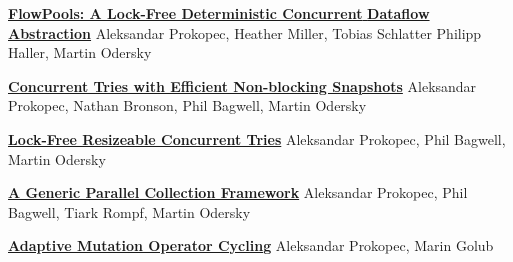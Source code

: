 \documentclass[9pt]{article}
\begin{document}
\noindent\href{http://axel22.github.io/resources/docs/lcpc2012.pdf}
{\bf FlowPools: A Lock-Free Deterministic Concurrent }
\newline
\noindent\href{http://axel22.github.io/resources/docs/lcpc2012.pdf}
{\bf Dataflow Abstraction}
\newline
\noindent Aleksandar Prokopec, Heather Miller, Tobias Schlatter
\newline
\noindent Philipp Haller, Martin Odersky
\newline
{}
\bigskip

\noindent\href{http://axel22.github.io/resources/docs/ctries-snapshot.pdf}
{\bf Concurrent Tries with Efficient Non-blocking Snapshots}
\newline
\noindent Aleksandar Prokopec, Nathan Bronson, Phil Bagwell, Martin Odersky
\newline
{}
\bigskip

\noindent\href{http://lampwww.epfl.ch/~prokopec/lcpc_ctries.pdf}
{\bf Lock-Free Resizeable Concurrent Tries}
\newline
\noindent Aleksandar Prokopec, Phil Bagwell, Martin Odersky
\newline
{}
\bigskip

\noindent\href{http://infoscience.epfl.ch/record/165523/files/techrep.pdf}
{\bf A Generic Parallel Collection Framework}
\newline
\noindent Aleksandar Prokopec, Phil Bagwell, Tiark Rompf, Martin Odersky
\newline
{}
\bigskip

\noindent\href{http://axel22.github.io/resources/docs/icadiwt_atga.pdf}
{\bf Adaptive Mutation Operator Cycling}
\newline
\noindent Aleksandar Prokopec, Marin Golub
\newline
{}
\newline
{}
\bigskip
\bigskip
\bigskip


\end{document}
